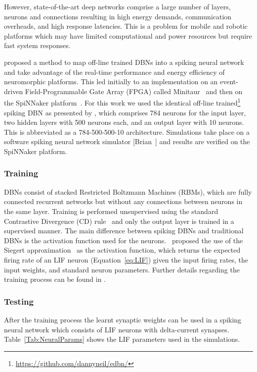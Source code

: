 \documentclass{frontiersENG} %
\begin{document}
However, state-of-the-art deep networks comprise a large number of layers, neurons and connections resulting in high energy demands, communication overheads, and high response latencies. This is a problem for mobile and robotic platforms which may have limited computational and power resources but require fast system responses. 


\citet{o2013real} proposed a method to map off-line trained DBNs into a spiking neural network and take advantage of the real-time performance and energy efficiency of neuromorphic platforms. This led initially to an implementation on an event-driven Field-Programmable Gate Array (FPGA) called Minitaur~\citep{neil2014minitaur} and then on the SpiNNaker platform~\citep{Stromatias2015scalable}. For this work we used the identical off-line trained\footnote{\url{https://github.com/dannyneil/edbn/}} spiking DBN as presented by \citet{o2013real}, which comprises 784 neurons for the input layer, two hidden layers with 500 neurons each, and an output layer with 10 neurons. This is abbreviated as a 784-500-500-10 architecture. Simulations take place on a software spiking neural network simulator [Brian~\citep{goodman2008brian}] and results are verified on the SpiNNaker platform.

\subsubsection{Training}

DBNs consist of stacked Restricted Boltzmann Machines (RBMs), which are fully connected recurrent networks but without any connections between neurons in the same layer. Training is performed unsupervised using the standard Contrastive Divergence (CD) rule~\citep{hinton2006fast} and only the output layer is trained in a supervised manner. The main difference between spiking DBNs and traditional DBNs is the activation function used for the neurons.~\cite{o2013real} proposed the use of the Siegert approximation~\citep{Jug_etal_2012} as the activation function, which returns the expected firing rate of an LIF neuron (Equation~\ref{eq:LIF}) given the input firing rates, the input weights, and standard neuron parameters. Further details regarding the training process can be found in \citet{o2013real}.

\subsubsection{Testing}
After the training process the learnt synaptic weights can be used in a spiking neural network which consists of LIF neurons with delta-current synapses. Table~\ref{Tab:NeuralParams} shows the LIF parameters used in the simulations.
\end{document}
